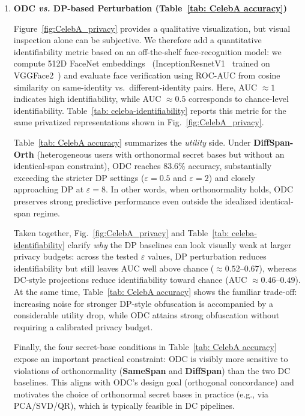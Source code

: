 \documentclass[final,3p,times]{elsarticle}
\theoremstyle{plain}
\begin{document}
\begin{enumerate}[label=\textbf{\Roman*.}, leftmargin=*]
\item \textbf{ODC \emph{vs.} DP-based Perturbation (Table~\ref{tab: CelebA accuracy})}

Figure~\ref{fig:CelebA_privacy} provides a qualitative visualization, but visual inspection alone can be subjective. We therefore add a quantitative identifiability metric based on an off-the-shelf face-recognition model: we compute 512D FaceNet embeddings~\cite{facenet} (InceptionResnetV1~\cite{resnet} trained on VGGFace2~\cite{vggface}) and evaluate face verification using ROC-AUC from cosine similarity on same-identity vs.\ different-identity pairs. Here, AUC $\approx 1$ indicates high identifiability, while AUC $\approx 0.5$ corresponds to chance-level identifiability. Table~\ref{tab: celeba-identifiability} reports this metric for the same privatized representations shown in Fig.~\ref{fig:CelebA_privacy}.

Table~\ref{tab: CelebA accuracy} summarizes the \emph{utility} side. Under \textbf{DiffSpan-Orth} (heterogeneous users with orthonormal secret bases but without an identical-span constraint), ODC reaches $83.6\%$ accuracy, substantially exceeding the stricter DP settings ($\varepsilon=0.5$ and $\varepsilon=2$) and closely approaching DP at $\varepsilon=8$. In other words, when orthonormality holds, ODC preserves strong predictive performance even outside the idealized identical-span regime.

Taken together, Fig.~\ref{fig:CelebA_privacy} and Table~\ref{tab: celeba-identifiability} clarify \emph{why} the DP baselines can look visually weak at larger privacy budgets: across the tested $\varepsilon$ values, DP perturbation reduces identifiability but still leaves AUC well above chance ($\approx0.52$–$0.67$), whereas DC‑style projections reduce identifiability toward chance (AUC $\approx0.46$–$0.49$). At the same time, Table~\ref{tab: CelebA accuracy} shows the familiar trade-off: increasing noise for stronger DP-style obfuscation is accompanied by a considerable utility drop, while ODC attains strong obfuscation without requiring a calibrated privacy budget.

Finally, the four secret-base conditions in Table~\ref{tab: CelebA accuracy} expose an important practical constraint: ODC is visibly more sensitive to violations of orthonormality (\textbf{SameSpan} and \textbf{DiffSpan}) than the two DC baselines. This aligns with ODC's design goal (orthogonal concordance) and motivates the choice of orthonormal secret bases in practice (e.g., via PCA/SVD/QR), which is typically feasible in DC pipelines.


\end{enumerate}
\end{document}
